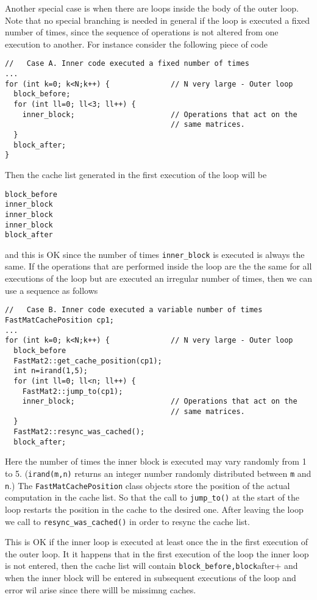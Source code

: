Another special case is when there are loops inside the body of the
outer loop.  Note that no special branching is needed in general if
the loop is executed a fixed number of times, since the sequence of
operations is not altered from one execution to another.  
For instance consider the following piece of code
%
\begin{verbatim}
//   Case A. Inner code executed a fixed number of times
...
for (int k=0; k<N;k++) {              // N very large - Outer loop 
  block_before;
  for (int ll=0; ll<3; ll++) {
    inner_block;                      // Operations that act on the
                                      // same matrices.
  }
  block_after;
}
\end{verbatim}
%
Then the cache list generated in the first execution of the loop will
be
%
\begin{verbatim}
block_before
inner_block
inner_block
inner_block
block_after
\end{verbatim}
%
and this is OK since the number of times \verb+inner_block+ is
executed is always the same.  If the operations that are performed
inside the loop are the the same for all executions of the loop but
are executed an irregular number of times, then we can use a sequence
as follows
%
\begin{verbatim}
//   Case B. Inner code executed a variable number of times
FastMatCachePosition cp1;
...
for (int k=0; k<N;k++) {              // N very large - Outer loop 
  block_before
  FastMat2::get_cache_position(cp1);
  int n=irand(1,5);
  for (int ll=0; ll<n; ll++) {
    FastMat2::jump_to(cp1);
    inner_block;                      // Operations that act on the
                                      // same matrices.
  }
  FastMat2::resync_was_cached();
  block_after;
\end{verbatim}
%
Here the number of times the inner block is executed may vary randomly
from 1 to 5.  (\verb+irand(m,n)+ returns an integer number randomly
distributed between \verb+m+ and \verb+n+.) The
\verb+FastMatCachePosition+ class objects store the position of the
actual computation in the cache list. So that the call to
\verb+jump_to()+ at the start of the loop restarts the position in the
cache to the desired one. After leaving the loop we call to
\verb+resync_was_cached()+ in order to resync the cache list. 

This is OK if the inner loop is executed at least once the in the
first execution of the outer loop. It it happens that in the first
execution of the loop the inner loop is not entered, then the cache
list will contain \verb+block_before,block+after+ and when the inner
block will be entered in subsequent executions of the loop and error
wil arise since there willl be missimng caches. 

